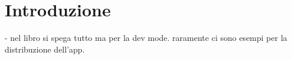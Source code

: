 \chapter{Introduzione}

- nel libro si spega tutto ma per la dev mode. raramente ci sono esempi per la distribuzione dell'app.